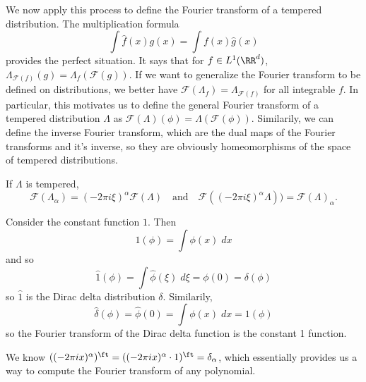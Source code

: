 We now apply this process to define the Fourier transform of a tempered distribution. The multiplication formula
%
\[ \int \widehat{f}(x) g(x) = \int f(x) \widehat{g}(x) \]
%
provides the perfect situation. It says that for $f \in L^1(\RR^d)$, $\Lambda_{\mathcal{F}(f)}(g) = \Lambda_f(\mathcal{F}(g))$. If we want to generalize the Fourier transform to be defined on distributions, we better have $\mathcal{F}(\Lambda_f) = \Lambda_{\mathcal{F}(f)}$ for all integrable $f$. In particular, this motivates us to define the general Fourier transform of a tempered distribution $\Lambda$ as $\mathcal{F}(\Lambda)(\phi) = \Lambda \left( \mathcal{F}(\phi) \right)$. Similarily, we can define the inverse Fourier transform, which are the dual maps of the Fourier transforms and it's inverse, so they are obviously homeomorphisms of the space of tempered distributions.

\begin{theorem}
    If $\Lambda$ is tempered,
    \[ \mathcal{F}(\Lambda_\alpha) = (-2 \pi i \xi)^\alpha \mathcal{F}(\Lambda)\quad\text{and}\quad \mathcal{F}((-2\pi i \xi)^\alpha \Lambda)) = \mathcal{F}(\Lambda)_\alpha. \]
\end{theorem}

\begin{example}
    Consider the constant function $1$. Then
    \[ 1(\phi) = \int \phi(x)\; dx \]
    and so
    \[ \widehat{1}(\phi) = \int \widehat{\phi}(\xi)\; d\xi = \phi(0) = \delta(\phi) \]
    so $\widehat{1}$ is the Dirac delta distribution $\delta$. Similarily,
    \[ \widehat{\delta}(\phi) = \widehat{\phi}(0) = \int \phi(x)\; dx = 1(\phi) \]
    so the Fourier transform of the Dirac delta function is the constant 1 function.
\end{example}

\begin{example}
    We know $((-2 \pi i x)^\alpha)^\ft = ((- 2 \pi i x)^\alpha \cdot 1)^\ft = \delta_\alpha$, which essentially provides us a way to compute the Fourier transform of any polynomial.
\end{example}


